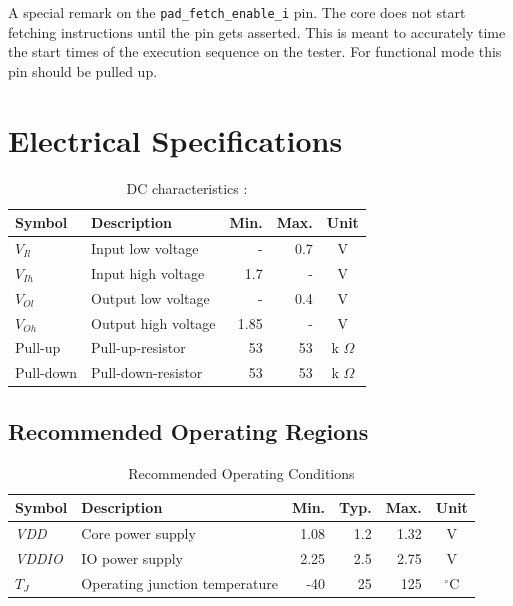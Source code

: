   A special remark on the \verb+pad_fetch_enable_i+ pin. The core does not start fetching instructions until the pin gets asserted. This is meant to accurately time the start times of the execution sequence on the tester. For functional mode this pin should be pulled up.

\FloatBarrier

\section{Electrical Specifications}

\begin{table}[htbp]
 \caption[DC characteristics]{DC characteristics \cite{faraday}:} \label{tab:elect_rec}
\centering
\begin{tabularx}{\textwidth}{|l|X|r|r|c|} 
 \hline
  Symbol & Description & Min. & Max. & Unit \\ \hline
  $V_{Il}$ & Input low voltage & - & 0.7 & V \\ \hline
  $V_{Ih}$ & Input high voltage & 1.7 & - & V \\ \hline
  $V_{Ol}$ & Output low voltage & - & 0.4 & V \\ \hline
  $V_{Oh}$ & Output high voltage & 1.85 & - & V \\ \hline
  Pull-up & Pull-up-resistor & 53 & 53 & k $\Omega$ \\ \hline
  Pull-down & Pull-down-resistor & 53 & 53 & k $\Omega$ \\ \hline
 \end{tabularx}
 \end{table}

\subsection{Recommended Operating Regions}
\begin{table}[htbp]
 \caption[Recommended Operating Conditions]{Recommended Operating Conditions \cite{faraday}}
 \label{tab:elect_rec}
\centering\begin{tabularx}{\textwidth}{|l|X|r|r|r|c|} \hline
Symbol & Description & Min. & Typ. & Max. & Unit \\ \hline
\textit{VDD} & Core power supply & 1.08 & 1.2 & 1.32 & V \\ \hline
\textit{VDDIO} & IO power supply & 2.25 & 2.5 & 2.75 & V \\ \hline
$T_J$ & Operating junction temperature & -40 & 25 & 125 &  $^\circ$C \\ \hline
 \end{tabularx}
 \end{table}

